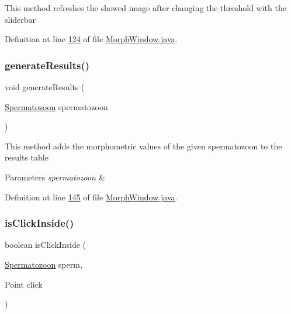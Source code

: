 This method refreshes the showed image after changing the threshold with the sliderbar 

Definition at line \hyperlink{_morph_window_8java_source_l00124}{124} of file \hyperlink{_morph_window_8java_source}{Morph\+Window.\+java}.

\hypertarget{classgui_1_1_morph_window_ad0a9220fe384d0c206692bc041ef4bb6}{}\label{classgui_1_1_morph_window_ad0a9220fe384d0c206692bc041ef4bb6} 
\subsubsection{\texorpdfstring{generate\+Results()}{generateResults()}}
{\footnotesize\ttfamily void generate\+Results (\begin{DoxyParamCaption}\item[{\hyperlink{classdata_1_1_spermatozoon}{Spermatozoon}}]{spermatozoon }\end{DoxyParamCaption})\hspace{0.3cm}{\ttfamily [private]}}

This method adds the morphometric values of the given spermatozoon to the results table


\begin{DoxyParams}{Parameters}
{\em spermatozoon} & \\
\hline
\end{DoxyParams}


Definition at line \hyperlink{_morph_window_8java_source_l00145}{145} of file \hyperlink{_morph_window_8java_source}{Morph\+Window.\+java}.

\hypertarget{classgui_1_1_morph_window_aab859aa1fe697dc9361ea47ccc6a80a5}{}\label{classgui_1_1_morph_window_aab859aa1fe697dc9361ea47ccc6a80a5} 
\subsubsection{\texorpdfstring{is\+Click\+Inside()}{isClickInside()}}
{\footnotesize\ttfamily boolean is\+Click\+Inside (\begin{DoxyParamCaption}\item[{\hyperlink{classdata_1_1_spermatozoon}{Spermatozoon}}]{sperm,  }\item[{Point}]{click }\end{DoxyParamCaption})}

